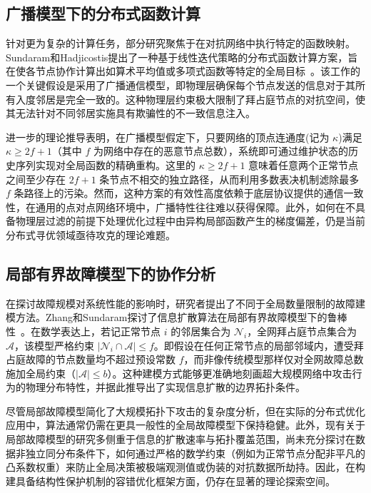 \documentclass[12pt,hyperref,a4paper,UTF8]{ctexart}
\numberwithin{equation}{section}
\numberwithin{figure}{section}
\numberwithin{table}{section}
\begin{document}
\subsection{广播模型下的分布式函数计算}

\quad \quad  针对更为复杂的计算任务，部分研究聚焦于在对抗网络中执行特定的函数映射。Sundaram和Hadjicostis提出了一种基于线性迭代策略的分布式函数计算方案，旨在使各节点协作计算出如算术平均值或多项式函数等特定的全局目标~\cite{sundaram2011distributed}。该工作的一个关键假设是采用了广播通信模型，即物理层确保每个节点发送的信息对于其所有入度邻居是完全一致的。这种物理层约束极大限制了拜占庭节点的对抗空间，使其无法针对不同邻居实施具有欺骗性的不一致信息注入。

进一步的理论推导表明，在广播模型假定下，只要网络的顶点连通度(记为 $\kappa$)满足 $\kappa \ge 2f+1$（其中 $f$ 为网络中存在的恶意节点总数），系统即可通过维护状态的历史序列实现对全局函数的精确重构。这里的 $\kappa \ge 2f+1$ 意味着任意两个正常节点之间至少存在 $2f+1$ 条节点不相交的独立路径，从而利用多数表决机制滤除最多 $f$ 条路径上的污染。然而，这种方案的有效性高度依赖于底层协议提供的通信一致性，在通用的点对点网络环境中，广播特性往往难以获得保障。此外，如何在不具备物理层过滤的前提下处理优化过程中由异构局部函数产生的梯度偏差，仍是当前分布式寻优领域亟待攻克的理论难题。

\subsection{局部有界故障模型下的协作分析}

\quad \quad  在探讨故障规模对系统性能的影响时，研究者提出了不同于全局数量限制的故障建模方法。Zhang和Sundaram探讨了信息扩散算法在局部有界故障模型下的鲁棒性~\cite{6315661}。在数学表达上，若记正常节点 $i$ 的邻居集合为 $\mathcal{N}_i$，全网拜占庭节点集合为 $\mathcal{A}$，该模型严格约束 $|\mathcal{N}_i \cap \mathcal{A}| \le f$。即假设在任何正常节点的局部邻域内，遭受拜占庭故障的节点数量均不超过预设常数 $f$，而非像传统模型那样仅对全网故障总数施加全局约束（$|\mathcal{A}| \le b$）。这种建模方式能够更准确地刻画超大规模网络中攻击行为的物理分布特性，并据此推导出了实现信息扩散的边界拓扑条件。

尽管局部故障模型简化了大规模拓扑下攻击的复杂度分析，但在实际的分布式优化应用中，算法通常仍需在更具一般性的全局故障模型下保持稳健。此外，现有关于局部故障模型的研究多侧重于信息的扩散速率与拓扑覆盖范围，尚未充分探讨在数据非独立同分布条件下，如何通过严格的数学约束（例如为正常节点分配非平凡的凸系数权重）来防止全局决策被极端观测值或伪装的对抗数据所劫持。因此，在构建具备结构性保护机制的容错优化框架方面，仍存在显著的理论探索空间。
\end{document}
